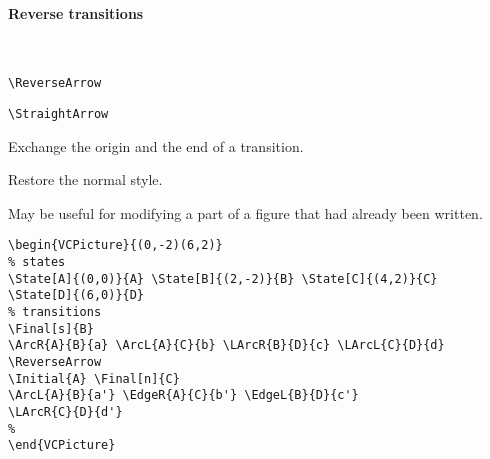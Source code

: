 \documentclass[11pt,twoside]{article}
\newlength{\ColoText}%
\newlength{\ColoFigu}%
\newlength{\parindenttemp} %
\newcommand{\noi}{\noindent}
\newcommand{\ee}{\text{\qquad}}               %
\newlength{\jsIndent}%
\newlength{\ColSource}%
\newlength{\ColFigur}%
\begin{document}
\paragraph{Reverse transitions}
~

\noi 
\hspace*{-\jsIndent}
\begin{minipage}[t]{\ColoText}
        \par\vspace*{0mm}%
        \footnotesize
\verb+\ReverseArrow+ \ee 
   
\medskip 
\verb+\StraightArrow+ \ee 
   
\end{minipage}%
\hspace*{1.2em}%
\begin{minipage}[t]{\ColoFigu}%
\par\vspace*{0mm}%
Exchange the origin and the end of a transition.

\smallskip 

Restore the normal style.
\end{minipage}%

\medskip
\noi 
May be useful for modifying a part of a figure that had already been 
written.

\noi 
\hspace*{-\jsIndent}
\begin{minipage}[c]{\ColFigur}%
\par\vspace*{0mm}%
\bigskip 
\begin{center}
%
\end{center}
\end{minipage}%
\hspace*{1.2em}%
\begin{minipage}[c]{\ColSource}
\setlength{\parindent}{\parindenttemp}%
\par\vspace*{0mm}%
\footnotesize
\begin{verbatim}
\begin{VCPicture}{(0,-2)(6,2)}
% states
\State[A]{(0,0)}{A} \State[B]{(2,-2)}{B} \State[C]{(4,2)}{C}
\State[D]{(6,0)}{D} 
% transitions 
\Final[s]{B}
\ArcR{A}{B}{a} \ArcL{A}{C}{b} \LArcR{B}{D}{c} \LArcL{C}{D}{d}
\ReverseArrow
\Initial{A} \Final[n]{C}
\ArcL{A}{B}{a'} \EdgeR{A}{C}{b'} \EdgeL{B}{D}{c'}
\LArcR{C}{D}{d'}
%
\end{VCPicture}
\end{verbatim}
\normalsize
\end{minipage}%
\end{document}
